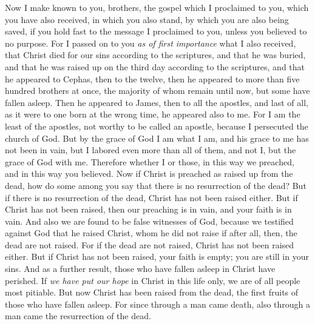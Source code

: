 \begin{biblechapter} %
 Now I make known to you, brothers, the gospel which I proclaimed to you, which you have also received, in which you also stand,
\verse by which you are also being saved, if you hold fast to the message I proclaimed to you, unless you believed to no purpose.
\verse For I passed on to you \textit{as of first importance} what I also received, that Christ died for our sins according to the scriptures,
\verse and that he was buried, and that he was raised up on the third day according to the scriptures,
\verse and that he appeared to Cephas, then to the twelve,
\verse then he appeared to more than five hundred brothers at once, the majority of whom remain until now, but some have fallen asleep.
\verse Then he appeared to James, then to all the apostles,
\verse and last of all, as it were to one born at the wrong time, he appeared also to me.
\verse For I am the least of the apostles, not worthy to be called an apostle, because I persecuted the church of God.
\verse But by the grace of God I am what I am, and his grace to me has not been in vain, but I labored even more than all of them, and not I, but the grace of God with me.
\verse Therefore whether I or those, in this way we preached, and in this way you believed.
 Now if Christ is preached as raised up from the dead, how do some among you say that there is no resurrection of the dead?
\verse But if there is no resurrection of the dead, Christ has not been raised either.
\verse But if Christ has not been raised, then our preaching is in vain, and your faith is in vain.
\verse And also we are found to be false witnesses of God, because we testified against God that he raised Christ, whom he did not raise if after all, then, the dead are not raised.
\verse For if the dead are not raised, Christ has not been raised either.
\verse But if Christ has not been raised, your faith is empty; you are still in your sins.
\verse And as a further result, those who have fallen asleep in Christ have perished.
\verse If \textit{we have put our hope} in Christ in this life only, we are of all people most pitiable.
\verse But now Christ has been raised from the dead, the first fruits of those who have fallen asleep.
\verse For since through a man came death, also through a man came the resurrection of the dead.

\end{biblechapter}
